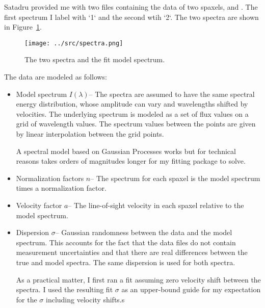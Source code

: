 \documentclass[11pt, oneside]{article}   	%
\begin{document}

Satadru provided me with two files containing the data of two spaxels,
 and .
The first spectrum I  label with `1` and the second wtih `2`.
The two spectra are shown in Figure~\ref{spectra:fig}.

\begin{figure}[htbp] %
   \centering
   \texttt{[image: ../src/spectra.png]} 
   \caption{The two spectra and the fit  model spectrum.
   \label{spectra:fig}}
\end{figure}

The data are modeled as follows:
\begin{itemize}
\item Model spectrum $I(\lambda)$-- The spectra are assumed to have the same spectral energy distribution, whose amplitude can vary and wavelengths shifted by velocities.
The underlying spectrum is modeled as a set of flux values on a grid of wavelength values.  The spectrum values between the points are given by linear interpolation between
the grid points.

A spectral model based on Gaussian Processes works but for technical reasons takes orders of magnitudes longer for my fitting package to solve.
\item Normalization factors $n$-- The spectrum for each spaxel is the model spectrum times a normalization factor.
\item Velocity factor $a$-- The line-of-sight velocity in each spaxel relative to the model spectrum.  
\item Dispersion $\sigma$-- Gaussian randomness between the data and the model spectrum.  This accounts for the fact
that the data files do not contain measurement uncertainties and that there are real differences between the true and model spectra.  The same dispersion
is used for both spectra.


As a practical matter, I first ran a fit assuming zero velocity shift between the spectra.   I used the resulting fit $\sigma$ as an upper-bound guide for my expectation for
the $\sigma$ including velocity shifts.s
\end{itemize}
\end{document}
